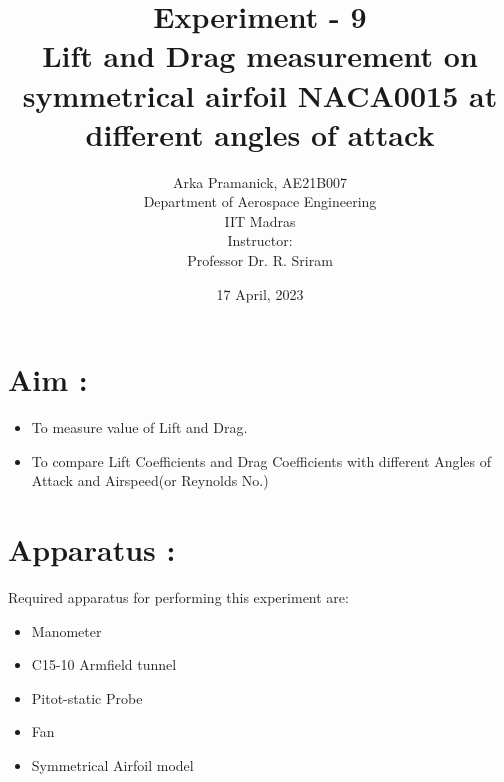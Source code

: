 \documentclass[12pt,a4paper]{article}
\title{{Experiment - 9\\ \textbf{ Lift and Drag measurement on symmetrical airfoil NACA0015 at different angles of attack}}}
\author{Arka Pramanick, AE21B007\\ Department of Aerospace Engineering\\ IIT Madras\\[3ex] Instructor:\\ \large Professor Dr. R. Sriram}
\date{17 April, 2023}
\begin{document}
\maketitle

\hline

\section{Aim :}
\begin{itemize}
    \item To measure value of Lift and Drag.
    \item To compare Lift Coefficients and Drag Coefficients with different Angles of Attack and Airspeed(or Reynolds No.)
\end{itemize}


\section{Apparatus :}
Required apparatus for performing this experiment are:
\begin{itemize}
    \item Manometer
    \item C15-10 Armfield tunnel
    \item Pitot-static Probe
    \item Fan
    \item Symmetrical Airfoil model
\end{itemize}



\newpage
\end{document}
